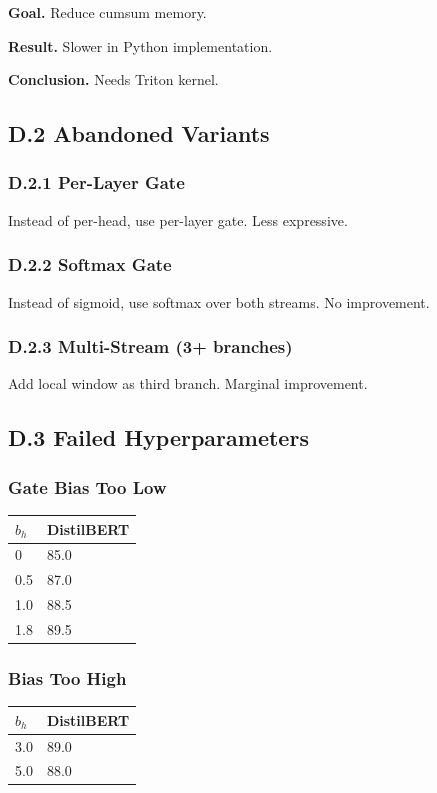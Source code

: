 \textbf{Goal.} Reduce cumsum memory.

\textbf{Result.} Slower in Python implementation.

\textbf{Conclusion.} Needs Triton kernel.

\subsection{D.2 Abandoned Variants}

\subsubsection{D.2.1 Per-Layer Gate}

Instead of per-head, use per-layer gate. Less expressive.

\subsubsection{D.2.2 Softmax Gate}

Instead of sigmoid, use softmax over both streams. No improvement.

\subsubsection{D.2.3 Multi-Stream (3+ branches)}

Add local window as third branch. Marginal improvement.

\subsection{D.3 Failed Hyperparameters}

\subsubsection{Gate Bias Too Low}
\begin{table}[H]
\centering
\small
\begin{tabular}{ll}
\toprule
\textbf{$b_h$} & \textbf{DistilBERT} \\
\midrule
0 & 85.0 \\
0.5 & 87.0 \\
1.0 & 88.5 \\
1.8 & 89.5 \\
\bottomrule
\end{tabular}
\end{table}

\subsubsection{Bias Too High}
\begin{table}[H]
\centering
\small
\begin{tabular}{ll}
\toprule
\textbf{$b_h$} & \textbf{DistilBERT} \\
\midrule
3.0 & 89.0 \\
5.0 & 88.0 \\
\bottomrule
\end{tabular}
\end{table}

